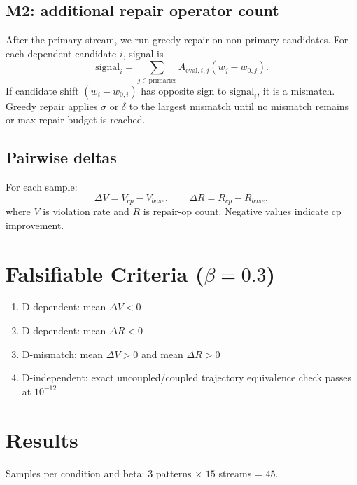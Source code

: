 \documentclass[11pt,a4paper]{article}
\begin{document}
\subsection{M2: additional repair operator count}
After the primary stream, we run greedy repair on non-primary candidates.
For each dependent candidate \(i\), signal is
\[
\text{signal}_i = \sum_{j\in\text{primaries}} A_{\text{eval},i,j}(w_j-w_{0,j}).
\]
If candidate shift \((w_i-w_{0,i})\) has opposite sign to \(\text{signal}_i\), it is a mismatch.
Greedy repair applies \(\sigma\) or \(\delta\) to the largest mismatch until no mismatch remains or max-repair budget is reached.

\subsection{Pairwise deltas}
For each sample:
\[
\Delta V = V_{cp} - V_{base},\qquad
\Delta R = R_{cp} - R_{base},
\]
where \(V\) is violation rate and \(R\) is repair-op count.
Negative values indicate cp improvement.

\section{Falsifiable Criteria (\(\beta=0.3\))}
\begin{enumerate}
  \item D-dependent: mean \(\Delta V < 0\)
  \item D-dependent: mean \(\Delta R < 0\)
  \item D-mismatch: mean \(\Delta V > 0\) and mean \(\Delta R > 0\)
  \item D-independent: exact uncoupled/coupled trajectory equivalence check passes at \(10^{-12}\)
\end{enumerate}

\section{Results}
Samples per condition and beta: \(3\) patterns \(\times\) \(15\) streams = \(45\).
\end{document}
